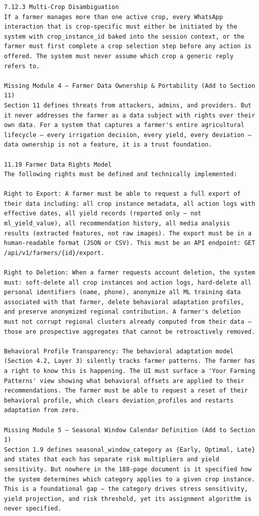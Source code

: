 \documentclass{article}
\begin{document}
\begin{verbatim}
7.12.3 Multi-Crop Disambiguation
If a farmer manages more than one active crop, every WhatsApp interaction that is crop-specific must either be initiated by the system with crop_instance_id baked into the session context, or the farmer must first complete a crop selection step before any action is offered. The system must never assume which crop a generic reply refers to.

Missing Module 4 — Farmer Data Ownership & Portability (Add to Section 11)
Section 11 defines threats from attackers, admins, and providers. But it never addresses the farmer as a data subject with rights over their own data. For a system that captures a farmer's entire agricultural lifecycle — every irrigation decision, every yield, every deviation — data ownership is not a feature, it is a trust foundation.

11.19 Farmer Data Rights Model
The following rights must be defined and technically implemented:

Right to Export: A farmer must be able to request a full export of their data including: all crop instance metadata, all action logs with effective dates, all yield records (reported only — not ml_yield_value), all recommendation history, all media analysis results (extracted features, not raw images). The export must be in a human-readable format (JSON or CSV). This must be an API endpoint: GET /api/v1/farmers/{id}/export.

Right to Deletion: When a farmer requests account deletion, the system must: soft-delete all crop instances and action logs, hard-delete all personal identifiers (name, phone), anonymize all ML training data associated with that farmer, delete behavioral adaptation profiles, and preserve anonymized regional contribution. A farmer's deletion must not corrupt regional clusters already computed from their data — those are prospective aggregates that cannot be retroactively removed.

Behavioral Profile Transparency: The behavioral adaptation model (Section 4.2, Layer 3) silently tracks farmer patterns. The farmer has a right to know this is happening. The UI must surface a 'Your Farming Patterns' view showing what behavioral offsets are applied to their recommendations. The farmer must be able to request a reset of their behavioral profile, which clears deviation_profiles and restarts adaptation from zero.

Missing Module 5 — Seasonal Window Calendar Definition (Add to Section 1)
Section 1.9 defines seasonal_window_category as {Early, Optimal, Late} and states that each has separate risk multipliers and yield sensitivity. But nowhere in the 188-page document is it specified how the system determines which category applies to a given crop instance. This is a foundational gap — the category drives stress sensitivity, yield projection, and risk threshold, yet its assignment algorithm is never specified.


\end{verbatim}
\end{document}
